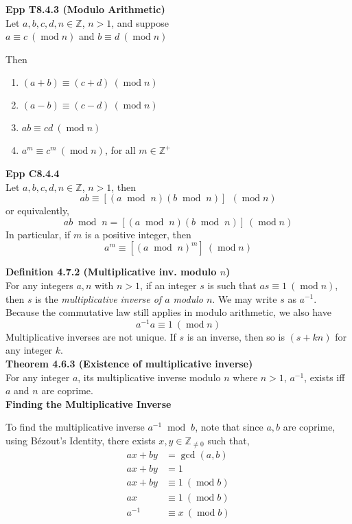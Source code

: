 \documentclass[a4paper]{article}
\newcommand{\subheading}[1]{{\scriptsize\textbf{#1}}}
\renewcommand\mod{\;\operatorname{mod}\;}  %
\newcommand\undermod[1]{\ (\operatorname{mod}#1)}
\begin{document}
\begin{multicols*}{4}
\subheading{Epp T8.4.3 (Modulo Arithmetic)}\\
Let $a, b, c, d, n \in \mathbb{Z}$, $n > 1$, and suppose\\

{\centering
  $a \equiv c \undermod{n}$ and $b \equiv d \undermod{n}$\\
}

Then

\begin{enumerate} \itemsep -0.5em
  \item $(a + b) \equiv (c + d) \undermod{n}$
  \item $(a - b) \equiv (c - d) \undermod{n}$
  \item $ab \equiv cd \undermod{n}$
  \item $a^m \equiv c^m \undermod{n}$, for all $m \in \mathbb{Z}^+$
\end{enumerate}

\subheading{Epp C8.4.4}\\
Let $a, b, c, d, n \in \mathbb{Z}$, $n > 1$, then
$$ ab \equiv [(a \mod n)(b \mod n)]\ \undermod{n} $$
or equivalently,
$$ ab \mod n = [(a \mod n)(b \mod n)] \undermod{n} $$
In particular, if $m$ is a positive integer, then
$$ a^m \equiv [(a \mod n)^m] \undermod{n} $$

\subheading{Definition 4.7.2 (Multiplicative inv. modulo $n$)}\\
For any integers $a, n$ with $n > 1$, if an integer $s$ is such that $as \equiv
1 \undermod{n}$, then $s$ is the \textit{multiplicative inverse of $a$
modulo $n$}. We may write $s$ as $a^{-1}$.\\

Because the commutative law still applies in modulo arithmetic, we also have
$$a^{-1}a \equiv 1 \undermod{n}$$
Multiplicative inverses are not unique. If $s$ is an inverse, then so is $(s +
kn)$ for any integer $k$.\\

\subheading{Theorem 4.6.3 (Existence of multiplicative inverse)}\\
For any integer $a$, its multiplicative inverse modulo $n$ where $n>1$,
$a^{-1}$, exists iff $a$ and $n$ are coprime.\\

\subheading{Finding the Multiplicative Inverse}

To find the multiplicative inverse $a^{-1} \mod b$, note that since $a, b$ are
coprime, using B\'ezout's Identity, there exists $x, y \in \mathbb{Z}_{\neq 0}$
such that,
\begin{align*}
  ax + by &= \gcd(a, b) \\
  ax + by &= 1 \\
  ax + by &\equiv 1 \undermod{b} \\
  ax &\equiv 1 \undermod{b} \\
  a^{-1} &\equiv x \undermod{b}
\end{align*}


\end{multicols*}
\end{document}
